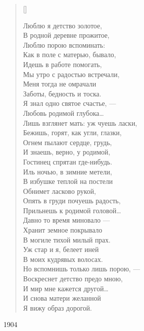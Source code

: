 \settowidth{\versewidth}{\vinВ родной деревне прожитое,}
\begin{verse}[\versewidth]
\begin{altverse}
Люблю я детство золотое,\\
В родной деревне прожитое,\\
Люблю порою вспоминать:\\
Как в поле с матерью, бывало,\\
Идешь в работе помогать,\\
Мы утро с радостью встречали,\\
Меня тогда не омрачали\\
Заботы, бедность и тоска.\\
Я знал одно святое счастье, ---\\
Любовь родимой глубока\ldots\\
Лишь взглянет мать: уж чуешь ласки,\\
Бежишь, горят, как угли, глазки,\\
Огнем пылают сердце, грудь,\\
И знаешь, верно, у родимой, \\
Гостинец спрятан где-нибудь.\\
Иль ночью, в зимние метели,\\
В избушке теплой на постели\\
Обнимет ласково рукой,\\
Опять в груди почуешь радость, \\
Прильнешь к родимой головой\ldots\\
Давно то время миновало ---\\
Хранит земное покрывало\\
В могиле тихой милый прах.\\
Уж стар и я, белеет иней\\
В моих кудрявых волосах.\\
Но вспомнишь только лишь порою, ---\\
Воскреснет детство предо мною,\\
И мир мне кажется другой\ldots\\
И снова матери желанной\\
Я вижу образ дорогой.
\end{altverse}
\end{verse}
1904

